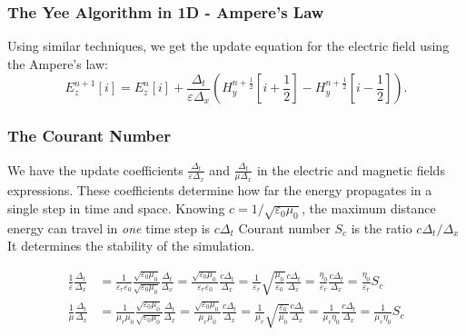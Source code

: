 \documentclass[10pt]{beamer}
\newcommand{\E}{\varepsilon}  %
\renewcommand{\u}{\mu}  %
\begin{document}
\begin{frame}
    \frametitle{The Yee Algorithm in 1D - Ampere's Law}
    Using similar techniques, we get the update equation for the electric field using the Ampere's law:
    \begin{equation}
        E_z^{n+1}\left[i\right] = E_z^{n}\left[i\right] +
        \frac{\Delta_t}{\E\Delta_x}
        \left(H_y^{n+\frac{1}{2}}\left[i+\frac{1}{2}\right] - H_y^{n+\frac{1}{2}}\left[i-\frac{1}{2}\right]\right).
    \end{equation}

\end{frame}

\begin{frame}
    \frametitle{The Courant Number}
    \begin{outline}
        \1 We have the update coefficients $\frac{\Delta_t}{\E\Delta_x}$ and $\frac{\Delta_t}{\u\Delta_x}$  in the electric and magnetic fields expressions.
        \1 These coefficients determine how far the energy propagates in a single step in time and space.
        \1 Knowing $c = 1/\sqrt{\E_0 \u_0}$, the maximum distance energy can travel in \textit{one} time step is $c \Delta_t$
        \1 Courant number $S_c$ is the ratio $c \Delta_t / \Delta_x$
        \2 It determines the stability of the simulation.
    \end{outline}

    \begin{align*}
        \frac{1}{\E} \frac{\Delta_{t}}{\Delta_{x}} & =\frac{1}{\E_{r} \E_{0}} \frac{\sqrt{\E_{0} \u_{0}}}{\sqrt{\E_{0} \u_{0}}} \frac{\Delta_{t}}{\Delta_{x}}=\frac{\sqrt{\E_{0} \u_{0}}}{\E_{r} \E_{0}} \frac{c \Delta_{t}}{\Delta_{x}}=\frac{1}{\E_{r}} \sqrt{\frac{\u_{0}}{\E_{0}}} \frac{c \Delta_{t}}{\Delta_{x}}=\frac{\eta_{0}}{\E_{r}} \frac{c \Delta_{t}}{\Delta_{x}}=\frac{\eta_{0}}{\E_{r}} S_{c}      \\
        \frac{1}{\u} \frac{\Delta_{t}}{\Delta_{x}} & = \frac{1}{\u_{r} \u_{0}} \frac{\sqrt{\E_{0} \u_{0}}}{\sqrt{\E_{0} \u_{0}}} \frac{\Delta_{t}}{\Delta_{x}}=\frac{\sqrt{\E_{0} \u_{0}}}{\u_{r} \u_{0}} \frac{c \Delta_{t}}{\Delta_{x}}=\frac{1}{\u_{r}} \sqrt{\frac{\E_{0}}{\u_{0}}} \frac{c \Delta_{t}}{\Delta_{x}}=\frac{1}{\u_{r} \eta_{0}} \frac{c \Delta_{t}}{\Delta_{x}}=\frac{1}{\u_{r} \eta_{0}} S_{c}
    \end{align*}
\end{frame}
\end{document}
